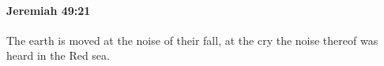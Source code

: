 
		\paragraph{Jeremiah 49:21} %
			\label{JEREMIAH-49-21}

			The earth is moved at the noise of their fall, at the cry the noise thereof was heard in the Red sea.


